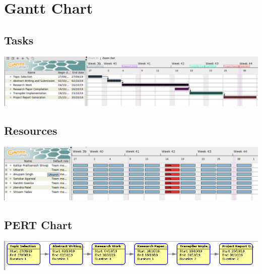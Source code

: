 \chapter{Gantt Chart}

\section{Tasks}
\includegraphics[width=15cm]{gantt/tasks.png}\\[1cm]

\section{Resources}

\includegraphics[width=15cm]{gantt/resources.png}\\[1cm]

\section{PERT Chart}

\includegraphics[width=15cm]{gantt/pert.png}\\[1cm]